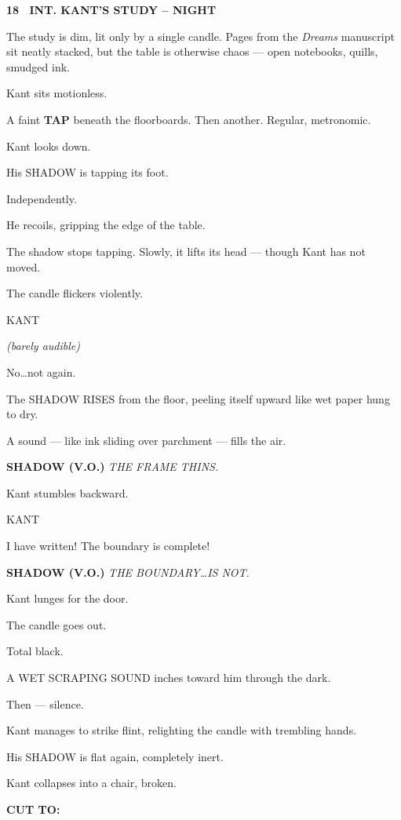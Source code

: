 \documentclass[12pt]{article}
\newcommand{\scene}[2]{%
  \vspace{1.8\baselineskip}%
  \noindent\textbf{#1 \ #2}\par\vspace{0.4\baselineskip}%
}
\newenvironment{dialogue}[1]{%
  \vspace{0.8\baselineskip}%
  \noindent\hspace*{2.3in}\textsc{#1}\par%
  \noindent\hspace*{1.5in}\begin{minipage}[t]{4.5in}%
}{%
  \end{minipage}\par%
}
\newcommand{\paren}[1]{%
  \noindent\hspace*{1.8in}\textit{(#1)}\par%
}
\newcommand{\transition}[1]{%
  \vspace{0.6\baselineskip}%
  \begin{flushright}\textbf{#1}\end{flushright}%
}
\begin{document}
\scene{18}{INT. KANT'S STUDY -- NIGHT}

The study is dim, lit only by a single candle. Pages from the
\textit{Dreams} manuscript sit neatly stacked, but the table is otherwise
chaos — open notebooks, quills, smudged ink.

Kant sits motionless.

A faint \textbf{TAP} beneath the floorboards. Then another. Regular, metronomic.

Kant looks down.

His SHADOW is tapping its foot.

Independently.

He recoils, gripping the edge of the table.

The shadow stops tapping. Slowly, it lifts its head — though Kant has
not moved.

The candle flickers violently.

\begin{dialogue}{KANT}
\paren{barely audible}
No\ldots not again.
\end{dialogue}

The SHADOW RISES from the floor, peeling itself upward like wet paper
hung to dry.

A sound — like ink sliding over parchment — fills the air.

\textbf{SHADOW (V.O.)}  
\emph{THE FRAME THINS.}

Kant stumbles backward.

\begin{dialogue}{KANT}
I have written! The boundary is complete!
\end{dialogue}

\textbf{SHADOW (V.O.)}  
\emph{THE BOUNDARY\ldots IS NOT.}

Kant lunges for the door.

The candle goes out.

Total black.

A WET SCRAPING SOUND inches toward him through the dark.

Then — silence.

Kant manages to strike flint, relighting the candle with trembling
hands.

His SHADOW is flat again, completely inert.

Kant collapses into a chair, broken.

\transition{CUT TO:}

\end{document}

